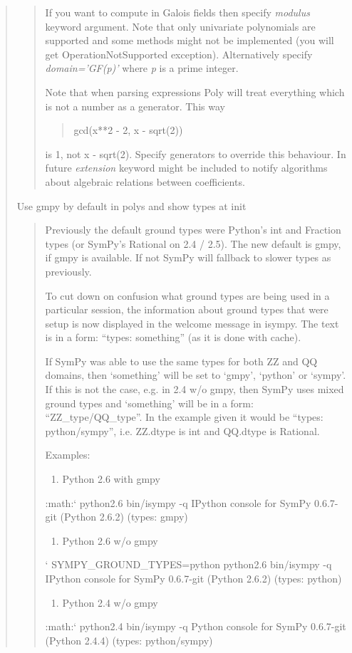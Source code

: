 \begin{quote}
\begin{quote}
If you want to compute in Galois fields then specify \emph{modulus}
keyword argument. Note that only univariate polynomials are
supported and some methods might not be implemented (you will
get OperationNotSupported exception). Alternatively specify
\emph{domain='GF(p)'} where \emph{p} is a prime integer.

Note that when parsing expressions Poly will treat everything
which is not a number as a generator. This way
\begin{quote}

gcd(x**2 - 2, x - sqrt(2))
\end{quote}

is 1, not x - sqrt(2). Specify generators to override this behaviour.
In future \emph{extension} keyword might be included to notify algorithms
about algebraic relations between coefficients.
\end{quote}

Use gmpy by default in polys and show types at init
\begin{quote}

Previously the default ground types were Python's int and Fraction
types (or SymPy's Rational on 2.4 / 2.5). The new default is gmpy,
if gmpy is available. If not SymPy will fallback to slower types
as previously.

To cut down on confusion what ground types are being used in a
particular session, the information about ground types that were
setup is now displayed in the welcome message in isympy. The text
is in a form: ``types: something'' (as it is done with cache).

If SymPy was able to use the same types for both ZZ and QQ domains,
then `something' will be set to `gmpy', `python' or `sympy'. If this
is not the case, e.g. in 2.4 w/o gmpy, then SymPy uses mixed ground
types and `something' will be in a form: ``ZZ\_type/QQ\_type''. In the
example given it would be ``types: python/sympy'', i.e. ZZ.dtype is
int and QQ.dtype is Rational.

Examples:
\begin{enumerate}
\item {}
Python 2.6 with gmpy

\end{enumerate}

:math:{}` python2.6 bin/isympy -q
IPython console for SymPy 0.6.7-git (Python 2.6.2) (types: gmpy)
\begin{enumerate}
\item {}
Python 2.6 w/o gmpy

\end{enumerate}

{}` SYMPY\_GROUND\_TYPES=python python2.6 bin/isympy -q
IPython console for SymPy 0.6.7-git (Python 2.6.2) (types: python)
\begin{enumerate}
\item {}
Python 2.4 w/o gmpy

\end{enumerate}

:math:{}` python2.4 bin/isympy -q
Python console for SymPy 0.6.7-git (Python 2.4.4) (types: python/sympy)
\end{quote}
\end{quote}


